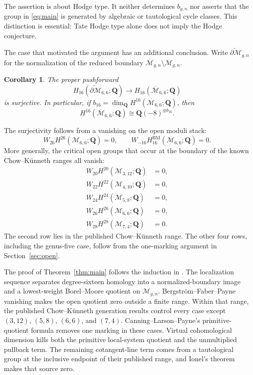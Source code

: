 \documentclass[12pt,reqno]{amsart}
\newcommand{\Q}{\mathbf{Q}}
\newcommand{\M}{\mathcal{M}}
\newcommand{\Mbar}{\overline{\mathcal{M}}}
\newcommand{\BM}{\mathrm{BM}}
\newtheorem{corollary}[theorem]{Corollary}
\theoremstyle{definition}
\theoremstyle{remark}
\begin{document}
The assertion is about Hodge type.  It neither determines $b_{g,n}$ nor
asserts that the group in \eqref{eq:main} is generated by algebraic or
tautological cycle classes.  This distinction is essential: Tate Hodge type
alone does not imply the Hodge conjecture.

The case that motivated the argument has an additional conclusion.  Write
$\widetilde{\partial\M}_{g,n}$ for the normalization of the reduced boundary
$\Mbar_{g,n}\setminus\M_{g,n}$.

\begin{corollary}\label{cor:66-intro}
The proper pushforward
\begin{equation}\label{eq:66-boundary-surj-intro}
 H_{16}(\widetilde{\partial\M}_{6,6};\Q)
 \longrightarrow H_{16}(\Mbar_{6,6};\Q)
\end{equation}
is surjective.  In particular, if
$b_{16}=\dim_{\Q}H^{16}(\Mbar_{6,6};\Q)$, then
\[
 H^{16}(\Mbar_{6,6};\Q)\cong\Q(-8)^{\oplus b_{16}}.
\]
\end{corollary}

The surjectivity follows from a vanishing on the open moduli stack:
\begin{equation}\label{eq:66-open-intro}
 W_{26}H^{26}(\M_{6,6};\Q)=0,
 \qquad
 W_{-16}H^{\BM}_{16}(\M_{6,6};\Q)=0.
\end{equation}
More generally, the critical open groups that occur at the boundary of the
known Chow--K\"unneth ranges all vanish:
\begin{equation}\label{eq:critical-intro}
\begin{split}
 W_{20}H^{20}(\M_{3,12};\Q)&=0,\\
 W_{22}H^{22}(\M_{4,10};\Q)&=0,\\
 W_{24}H^{24}(\M_{5,8};\Q)&=0,\\
 W_{26}H^{26}(\M_{6,6};\Q)&=0,\\
 W_{28}H^{28}(\M_{7,4};\Q)&=0.
\end{split}
\end{equation}
The second row lies in the published Chow--K\"unneth range.  The other four
rows, including the genus-five case, follow from the one-marking argument in
Section~\ref{sec:open}.

The proof of Theorem~\ref{thm:main} follows the induction in
\cite[Section~6.2]{CLP}.  The localization sequence separates degree-sixteen
homology into a normalized-boundary image and a lowest-weight Borel--Moore
quotient on $\M_{g,n}$.  Bergstr\"om--Faber--Payne vanishing makes the open
quotient zero outside a finite range.  Within that range, the published
Chow--K\"unneth generation results control every case except
$(3,12)$, $(5,8)$, $(6,6)$, and $(7,4)$.  Canning--Larson--Payne's
primitive-quotient formula removes one marking in these cases.  Virtual
cohomological dimension kills both the primitive local-system quotient and
the unmultiplied pullback term.  The remaining cotangent-line term comes
from a tautological group at the inclusive endpoint of their published
range, and Ionel's theorem makes that source zero.
\end{document}
